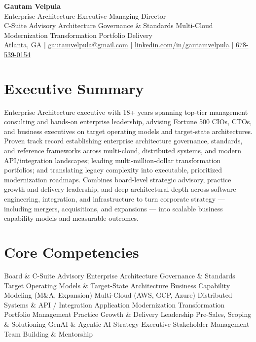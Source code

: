 \documentclass[11pt]{article}
\begin{document}
\begin{center}
    {\LARGE \textbf{Gautam Velpula}} \\[4pt]
    Enterprise Architecture Executive \textbar{} Managing Director \\[6pt]
    C-Suite Advisory \textbullet{} Architecture Governance \& Standards \textbullet{} Multi-Cloud Modernization \textbullet{} Transformation Portfolio Delivery \\[6pt]
    Atlanta, GA \;|\;
    \href{mailto:gautamvelpula@gmail.com}{gautamvelpula@gmail.com} \;|\;
    \href{https://www.linkedin.com/in/gautamvelpula}{linkedin.com/in/gautamvelpula} \;|\;
    \href{tel:6785390154}{678-539-0154}
\end{center}

\vspace{8pt}

\section*{Executive Summary}
Enterprise Architecture executive with 18+ years spanning top-tier management consulting and hands-on enterprise leadership, advising Fortune 500 CIOs, CTOs, and business executives on target operating models and target-state architectures. Proven track record establishing enterprise architecture governance, standards, and reference frameworks across multi-cloud, distributed systems, and modern API/integration landscapes; leading multi-million-dollar transformation portfolios; and translating legacy complexity into executable, prioritized modernization roadmaps. Combines board-level strategic advisory, practice growth and delivery leadership, and deep architectural depth across software engineering, integration, and infrastructure to turn corporate strategy --- including mergers, acquisitions, and expansions --- into scalable business capability models and measurable outcomes.

\section*{Core Competencies}
Board \& C-Suite Advisory \textbullet{} Enterprise Architecture Governance \& Standards \textbullet{} Target Operating Models \& Target-State Architecture \textbullet{} Business Capability Modeling (M\&A, Expansion) \textbullet{} Multi-Cloud (AWS, GCP, Azure) \textbullet{} Distributed Systems \& API / Integration \textbullet{} Application Modernization \textbullet{} Transformation Portfolio Management \textbullet{} Practice Growth \& Delivery Leadership \textbullet{} Pre-Sales, Scoping \& Solutioning \textbullet{} GenAI \& Agentic AI Strategy \textbullet{} Executive Stakeholder Management \textbullet{} Team Building \& Mentorship
\end{document}
